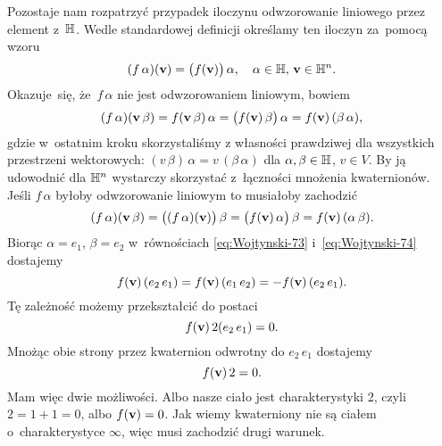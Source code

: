 \documentclass[a4paper,11pt]{article}
\begin{document}
Pozostaje nam rozpatrzyć przypadek iloczynu odwzorowanie liniowego przez
element z~$\mathbb{H}$. Wedle standardowej definicji określamy ten iloczyn
za~pomocą wzoru
\begin{equation}
  \label{eq:Wojtynski-72}
  ( f \, \alpha )( \mathbf{v} ) = \big( f( \mathbf{v} ) \big) \, \alpha, \quad
  \alpha \in \mathbb{H}, \, \mathbf{v} \in \mathbb{H}^{ n }.
\end{equation}
Okazuje~się, że~$f \, \alpha$ nie jest odwzorowaniem liniowym, bowiem
\begin{equation}
  \label{eq:Wojtynski-73}
  ( f \, \alpha )( \mathbf{v} \, \beta ) = f( \mathbf{v} \, \beta ) \, \alpha =
  \big( f( \mathbf{v} ) \, \beta \big) \, \alpha =
  f( \mathbf{v} ) \, ( \beta \, \alpha ),
\end{equation}
gdzie w~ostatnim kroku skorzystaliśmy z własności prawdziwej dla
wszystkich przestrzeni wektorowych:
$( v \, \beta ) \, \alpha = v \, ( \beta \, \alpha )$ dla $\alpha, \beta \in \mathbb{H}$, $v \in V$. By ją
udowodnić dla $\mathbb{H}^{ n }$ wystarczy skorzystać z~łączności mnożenia
kwaternionów. Jeśli $f \, \alpha$ byłoby odwzorowanie liniowym to musiałoby
zachodzić
\begin{equation}
  \label{eq:Wojtynski-74}
  ( f \, \alpha )( \mathbf{v} \, \beta ) =
  \big( ( f \, \alpha )( \mathbf{v} ) \big) \, \beta =
  \big( f( \mathbf{v} ) \, \alpha \big) \, \beta =
  f( \mathbf{v} ) \, ( \alpha \, \beta ).
\end{equation}
Biorąc $\alpha = e_{ 1 }$, $\beta = e_{ 2 }$ w~równościach \eqref{eq:Wojtynski-73}
i~\eqref{eq:Wojtynski-74} dostajemy
\begin{equation}
  \label{eq:Wojtynski-75}
  f( \mathbf{v} ) \, ( e_{ 2 } \, e_{ 1 } ) =
  f( \mathbf{v} ) \, ( e_{ 1 } \, e_{ 2 } ) =
  -f( \mathbf{v} ) \, ( e_{ 2 } \, e_{ 1 } ).
\end{equation}
Tę zależność możemy przekształcić do postaci
\begin{equation}
  \label{eq:Wojtynski-76}
  f( \mathbf{v} ) \, 2 ( e_{ 2 } \, e_{ 1 } ) = 0.
\end{equation}
Mnożąc obie strony przez kwaternion odwrotny do $e_{ 2 } \, e_{ 1 }$
dostajemy
\begin{equation}
  \label{eq:Wojtynski-77}
  f( \mathbf{v} ) \, 2 = 0.
\end{equation}
Mam więc dwie możliwości. Albo nasze ciało jest charakterystyki 2,
czyli~$2 = 1 + 1 = 0$, albo $f( \mathbf{v} ) = 0$. Jak wiemy kwaterniony nie
są ciałem o~charakterystyce $\infty$, więc musi zachodzić drugi warunek.
\end{document}
